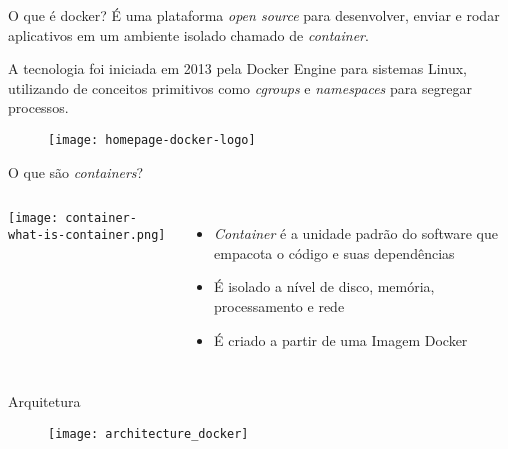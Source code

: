 \begin{frame}[t]{O que é docker?} 
    \transdissolve[duration=0.5]
    É uma plataforma \textit{open source} para desenvolver, enviar e rodar aplicativos em um ambiente isolado chamado de \textit{container}.

    A tecnologia foi iniciada em 2013 pela Docker Engine para sistemas Linux, utilizando de conceitos primitivos como \textit{cgroups} e \textit{namespaces} para segregar processos.\cite{redhat}
    
    \begin{figure}
        \texttt{[image: homepage-docker-logo]}
    \end{figure}
\end{frame}
\begin{frame}[t]{O que são \textit{containers}?} 
    \transdissolve[duration=0.5]
    \begin{columns} 
            \texttt{[image: container-what-is-container.png]}
            \begin{itemize}
                \item \textit{Container} é a unidade padrão do software que empacota o código e suas dependências
                \item É isolado a nível de disco, memória, processamento e rede
                \item É criado a partir de uma Imagem Docker
            \end{itemize}
          
    \end{columns}
\end{frame}
\begin{frame}[t]{Arquitetura} 
    \transdissolve[duration=0.5]

    \begin{figure}
        \centering
        \texttt{[image: architecture\_docker]}
        \caption{\cite{docker-overview}}
    \end{figure}
\end{frame}
